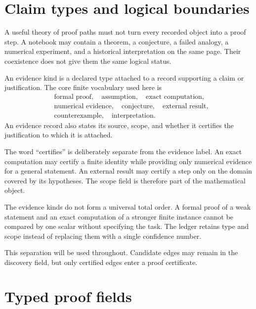 \section{Claim types and logical boundaries}
\label{PPT:sec:old2}

A useful theory of proof paths must not turn every recorded object into a proof step. A notebook may contain a theorem, a conjecture, a failed analogy, a numerical experiment, and a historical interpretation on the same page. Their coexistence does not give them the same logical status.

\begin{PPTdefinition}
\label{PPT:res:2:1}
An evidence kind is a declared type attached to a record supporting a claim or justification. The core finite vocabulary used here is
\[
\begin{aligned}
&\text{formal proof},\quad \text{assumption},\quad \text{exact computation},\\
&\text{numerical evidence},\quad \text{conjecture},\quad \text{external result},\\
&\text{counterexample},\quad \text{interpretation}.
\end{aligned}
\]
An evidence record also states its source, scope, and whether it certifies the justification to which it is attached.
\end{PPTdefinition}

The word ``certifies'' is deliberately separate from the evidence label. An exact computation may certify a finite identity while providing only numerical evidence for a general statement. An external result may certify a step only on the domain covered by its hypotheses. The scope field is therefore part of the mathematical object.

\begin{PPTwarning}
\label{PPT:res:2:2}
The evidence kinds do not form a universal total order. A formal proof of a weak statement and an exact computation of a stronger finite instance cannot be compared by one scalar without specifying the task. The ledger retains type and scope instead of replacing them with a single confidence number.
\end{PPTwarning}

This separation will be used throughout. Candidate edges may remain in the discovery field, but only certified edges enter a proof certificate.


\section{Typed proof fields}
\label{PPT:sec:old3}

